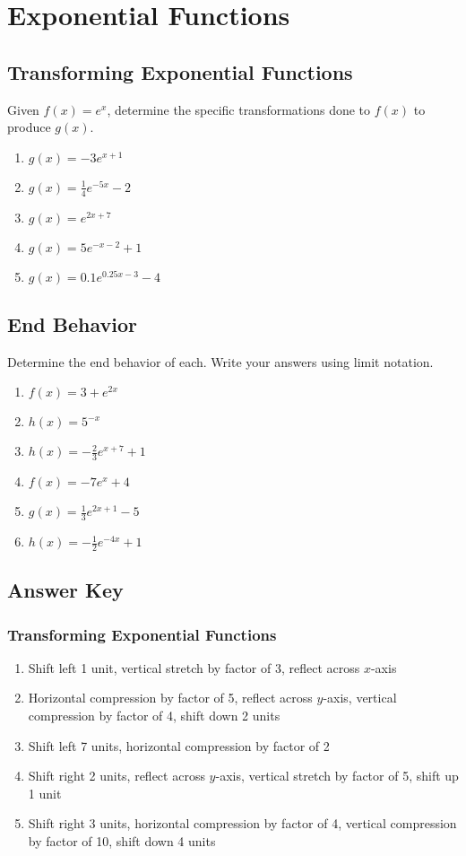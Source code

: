 \chapter{Exponential Functions}


\section{Transforming Exponential Functions}

Given $f(x) = e^x$, determine the specific transformations done to $f(x)$ to produce $g(x)$.
\begin{enumerate}
	\item $g(x) = -3e^{x+1}$
	\item $g(x) = \frac{1}{4}e^{-5x} - 2$
	\item $g(x) = e^{2x+7}$
	\item $g(x) = 5e^{-x-2} + 1$
	\item $g(x) = 0.1e^{0.25x-3} - 4$
\end{enumerate}	

\section{End Behavior}

Determine the end behavior of each. Write your answers using limit notation.
\begin{enumerate}
	\item $f(x) = 3 + e^{2x}$
	\item $h(x) = 5^{-x}$
	\item $h(x) = -\frac{2}{3}e^{x+7} + 1$
	\item $f(x) = -7e^x + 4$
	\item $g(x) = \frac{1}{3}e^{2x+1}-5$
	\item $h(x) = -\frac{1}{2}e^{-4x} + 1$
\end{enumerate}

\newpage

\section{Answer Key}

\subsection*{Transforming Exponential Functions}

\begin{enumerate}
	\item Shift left 1 unit, vertical stretch by factor of 3, reflect across $x$-axis
	\item Horizontal compression by factor of 5, reflect across $y$-axis, vertical compression by factor of 4, shift down 2 units
	\item Shift left 7 units, horizontal compression by factor of 2
	\item Shift right 2 units, reflect across $y$-axis, vertical stretch by factor of 5, shift up 1 unit
	\item Shift right 3 units, horizontal compression by factor of 4, vertical compression by factor of 10, shift down 4 units
\end{enumerate}

